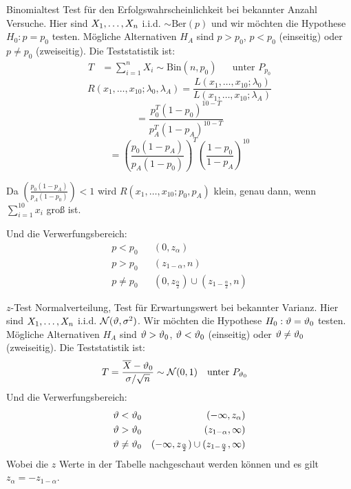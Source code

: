 \begin{definition}{Binomialtest}
  \color{red}Test für den Erfolgswahrscheinlichkeit bei bekannter Anzahl Versuche. \color{black} Hier sind
  $X_1, \dots, X_n$ i.i.d. $\sim \text{Ber}(p)$ und wir möchten die
  Hypothese $H_0 : p = p_0$ testen. Mögliche Alternativen $H_A$ sind $p > p_0$, $p < p_0$ (einseitig) oder $p \neq p_0$ (zweiseitig). Die Teststatistik ist:
  \begin{align*}
    T & = \sum_{i=1}^{n} X_i \sim \text{Bin}(n, p_0) &  & \text{unter } P_{p_0}
  \end{align*}
\[
R(x_1, \ldots, x_{10}; \lambda_0, \lambda_A) = \frac{L(x_1, \ldots, x_{10}; \lambda_0)}{L(x_1, \ldots, x_{10}; \lambda_A)}
\]
\[
= \frac{p_0^T (1 - p_0)^{10-T}}{p_A^T (1 - p_A)^{10-T}}
\]
\[
= \left( \frac{p_0(1 - p_A)}{p_A(1 - p_0)} \right)^T \left( \frac{1 - p_0}{1 - p_A} \right)^{10}
\]

Da $\left( \frac{p_0(1-p_A)}{p_A(1-p_0)} \right) < 1$ wird $R(x_1, \ldots, x_{10}; p_0, p_A)$ klein, genau dann, wenn $\sum_{i=1}^{10} x_i$ groß ist. 

  Und die Verwerfungsbereich:
  \begin{align*}
    p < p_0    &  & (0, z_\alpha)                                                      \\
    p > p_0    &  & (z_{1 - \alpha}, n)                                                 \\
    p \neq p_0 &  & (0, z_{\frac{\alpha}{2}}) \cup  (z_{1 - \frac{\alpha}{2}}, n)
  \end{align*}


  
\end{definition}
\begin{definition}{$z$-Test}
\color{red}Normalverteilung, Test für Erwartungswert bei bekannter Varianz. \color{black} Hier sind
$X_1, \dots, X_n$ i.i.d. $\mathcal{N} (\vartheta, \sigma^2)$. Wir möchten die
Hypothese $H_0 : \vartheta = \vartheta_0$ testen. Mögliche Alternativen $H_A$ sind $\vartheta >
  \vartheta_0$, $\vartheta < \vartheta_0$ (einseitig) oder $\vartheta \neq \vartheta_0$ (zweiseitig). Die
Teststatistik ist:
\begin{align*}
  T & = \frac{\overline{X} - \vartheta_0}{\sigma / \sqrt{n}} \sim \mathcal{N} (0, 1)
    &                                                                               & \text{unter } P_{\vartheta_0}
\end{align*}
Und die Verwerfungsbereich:
\begin{align*}
  \vartheta < \vartheta_0    &  & (-\infty, z_\alpha)                                                      \\
  \vartheta > \vartheta_0    &  & (z_{1 - \alpha}, \infty)                                                 \\
  \vartheta \neq \vartheta_0 &  & (-\infty, z_{\frac{\alpha}{2}}) \cup  (z_{1 - \frac{\alpha}{2}}, \infty)
\end{align*}
Wobei die $z$ Werte in der Tabelle nachgeschaut werden können
und es gilt $z_\alpha = - z_{1 - \alpha}$.
\end{definition}
\BoxStart{}
